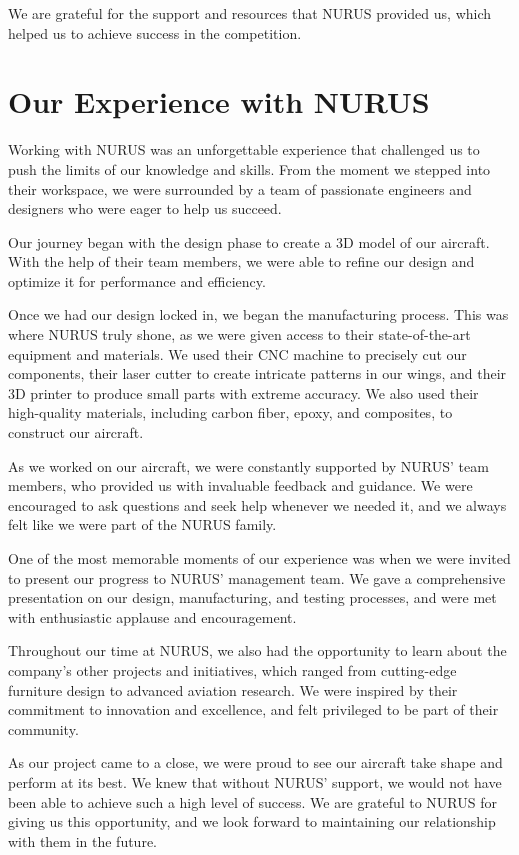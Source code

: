 \documentclass{article}
\begin{document}
We are grateful for the support and resources that NURUS provided us, which helped us to achieve success in the competition.



\section{Our Experience with NURUS}

Working with NURUS was an unforgettable experience that challenged us to push the limits of our knowledge and skills. From the moment we stepped into their workspace, we were surrounded by a team of passionate engineers and designers who were eager to help us succeed.

Our journey began with the design phase to create a 3D model of our aircraft. With the help of their team members, we were able to refine our design and optimize it for performance and efficiency.

Once we had our design locked in, we began the manufacturing process. This was where NURUS truly shone, as we were given access to their state-of-the-art equipment and materials. We used their CNC machine to precisely cut our components, their laser cutter to create intricate patterns in our wings, and their 3D printer to produce small parts with extreme accuracy. We also used their high-quality materials, including carbon fiber, epoxy, and composites, to construct our aircraft.

As we worked on our aircraft, we were constantly supported by NURUS' team members, who provided us with invaluable feedback and guidance. We were encouraged to ask questions and seek help whenever we needed it, and we always felt like we were part of the NURUS family.

One of the most memorable moments of our experience was when we were invited to present our progress to NURUS' management team. We gave a comprehensive presentation on our design, manufacturing, and testing processes, and were met with enthusiastic applause and encouragement.

Throughout our time at NURUS, we also had the opportunity to learn about the company's other projects and initiatives, which ranged from cutting-edge furniture design to advanced aviation research. We were inspired by their commitment to innovation and excellence, and felt privileged to be part of their community.

As our project came to a close, we were proud to see our aircraft take shape and perform at its best. We knew that without NURUS' support, we would not have been able to achieve such a high level of success. We are grateful to NURUS for giving us this opportunity, and we look forward to maintaining our relationship with them in the future.
\end{document}
